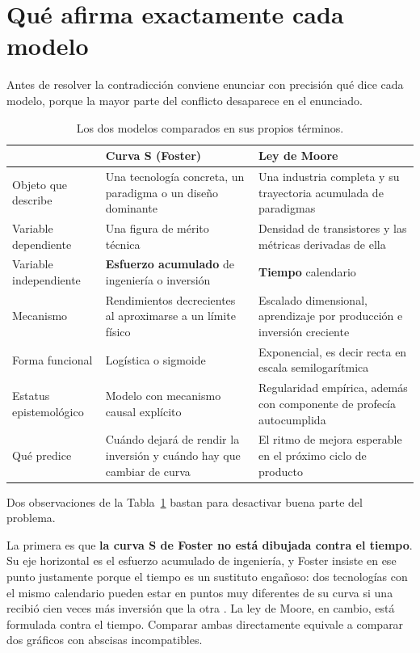 \documentclass[11pt,letterpaper]{article}
\begin{document}
\section{Qué afirma exactamente cada modelo}

Antes de resolver la contradicción conviene enunciar con precisión qué dice cada
modelo, porque la mayor parte del conflicto desaparece en el enunciado.

\begin{table}[ht]
  \centering
  \small
  \caption{Los dos modelos comparados en sus propios términos.}
  \label{tab:modelos}
  \begin{tabularx}{\textwidth}{@{}l >{\raggedright\arraybackslash}X >{\raggedright\arraybackslash}X@{}}
    \toprule
    & \textbf{Curva S (Foster)} & \textbf{Ley de Moore} \\
    \midrule
    Objeto que describe
      & Una tecnología concreta, un paradigma o un diseño dominante
      & Una industria completa y su trayectoria acumulada de paradigmas \\
    Variable dependiente
      & Una figura de mérito técnica
      & Densidad de transistores y las métricas derivadas de ella \\
    Variable independiente
      & \textbf{Esfuerzo acumulado} de ingeniería o inversión
      & \textbf{Tiempo} calendario \\
    Mecanismo
      & Rendimientos decrecientes al aproximarse a un límite físico
      & Escalado dimensional, aprendizaje por producción e inversión creciente \\
    Forma funcional
      & Logística o sigmoide
      & Exponencial, es decir recta en escala semilogarítmica \\
    Estatus epistemológico
      & Modelo con mecanismo causal explícito
      & Regularidad empírica, además con componente de profecía autocumplida \\
    Qué predice
      & Cuándo dejará de rendir la inversión y cuándo hay que cambiar de curva
      & El ritmo de mejora esperable en el próximo ciclo de producto \\
    \bottomrule
  \end{tabularx}
\end{table}

Dos observaciones de la Tabla~\ref{tab:modelos} bastan para desactivar buena
parte del problema.

La primera es que \textbf{la curva S de Foster no está dibujada contra el
tiempo}. Su eje horizontal es el esfuerzo acumulado de ingeniería, y Foster
insiste en ese punto justamente porque el tiempo es un sustituto engañoso: dos
tecnologías con el mismo calendario pueden estar en puntos muy diferentes de su
curva si una recibió cien veces más inversión que la otra \parencite{foster1986}.
La ley de Moore, en cambio, está formulada contra el tiempo. Comparar ambas
directamente equivale a comparar dos gráficos con abscisas incompatibles.
\end{document}
